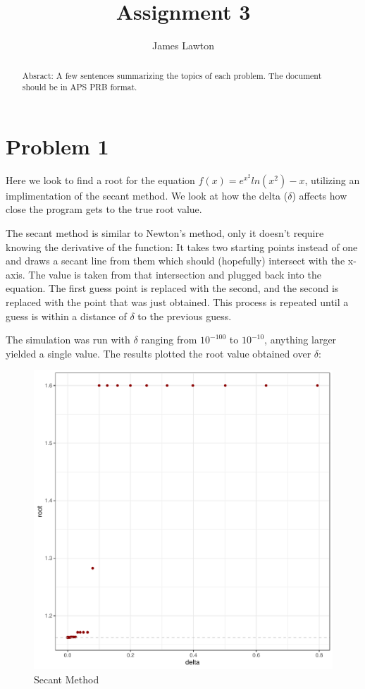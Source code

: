 \documentclass[prb,twocolumn]{revtex4-2}
\begin{document}
\title{Assignment 3}

\author{James Lawton}


\begin{abstract}
Absract: A few sentences summarizing the topics of each problem.  The document should be in APS PRB format.  
\end{abstract}

\maketitle

\section{Problem 1}

\noindent
Here we look to find a root for the equation $f(x)=e^{x^2}ln(x^2)-x$, utilizing an implimentation of the secant method. We look at how the delta ($\delta$) affects how close the program gets to the true root value.

The secant method is similar to Newton's method, only it doesn't require knowing the derivative of the function: It takes two starting points instead of one and draws a secant line from them which should (hopefully) intersect with the x-axis. The value is taken from that intersection and plugged back into the equation. The first guess point is replaced with the second, and the second is replaced with the point that was just obtained. This process is repeated until a guess is within a distance of $\delta$ to the previous guess.

The simulation was run with $\delta$ ranging from $10^{-100}$ to $10^{-10}$, anything larger yielded a single value. The results plotted the root value obtained over $\delta$:

\begin{figure}[h!]
\centerline{\includegraphics [width=3 in] {secant}} \caption{Secant Method} \label{secant}
\end{figure}
\end{document}
